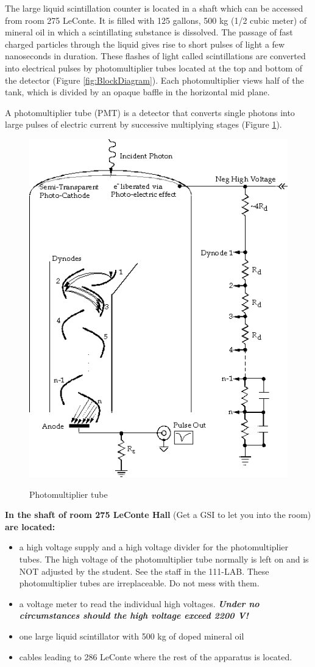 \documentclass{../lab}
\begin{document}
The large liquid scintillation counter is located in a shaft which can be accessed from room 275 LeConte. It is filled with 125 gallons, 500 kg (1/2 cubic meter) of mineral oil in which a scintillating substance is dissolved. The passage of fast charged particles through the liquid gives rise to short pulses of light a few nanoseconds in duration. These flashes of light called scintillations are converted into electrical pulses by photomultiplier tubes located at the top and bottom of the detector (Figure \ref{fig:BlockDiagram}). Each photomultiplier views half of the tank, which is divided by an opaque baffle in the horizontal mid plane.

A photomultiplier tube (PMT) is a detector that converts single photons into large pulses of electric current by successive multiplying stages (Figure \ref{fig:PhotomultiplierTube}).

\begin{figure}[h]
    \centering
    \href{http://experimentationlab.berkeley.edu/sites/default/files/images/MUOimage056.gif}{\includegraphics[width=0.5\linewidth]{images/MUOimage056.png}}
    \caption{Photomultiplier tube}
    \label{fig:PhotomultiplierTube}
\end{figure}

\noindent\textbf{In the shaft of room 275 LeConte Hall} (Get a GSI to let you into the room) \textbf{are located:}

\newpage

\begin{itemize}
    \item a high voltage supply and a high voltage divider for the photomultiplier tubes. The high voltage of the photomultiplier tube normally is left on and is NOT adjusted by the student. See the staff in the 111-LAB. These photomultiplier tubes are irreplaceable. Do not mess with them.

    \item a voltage meter to read the individual high voltages. \emph{\textbf{Under no circumstances should the high voltage exceed 2200 V!}}

    \item one large liquid scintillator with 500 kg of doped mineral oil

    \item cables leading to 286 LeConte where the rest of the apparatus is located.
\end{itemize}
\end{document}
